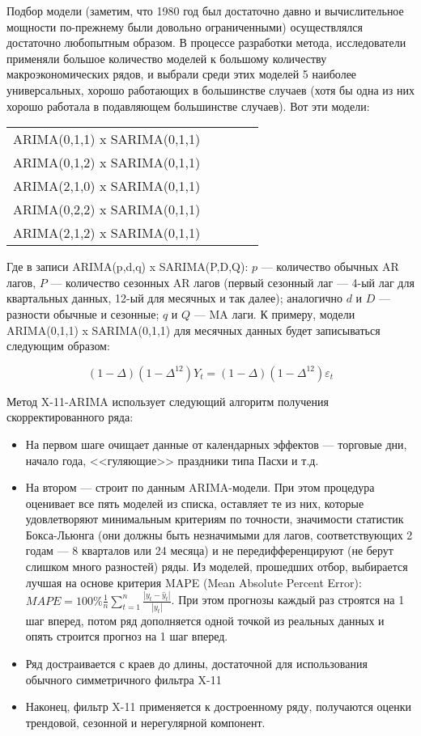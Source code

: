\documentclass[final,pdftex]{../../template/epsilonj}\usepackage[]{graphicx}\usepackage[]{color}
\begin{document}
Подбор модели (заметим, что 1980 год был достаточно давно и вычислительное мощности по-прежнему были довольно ограниченными) осуществлялся достаточно любопытным образом. В процессе разработки метода, исследователи применяли большое количество моделей к большому количеству макроэкономических рядов, и выбрали среди этих моделей 5 наиболее универсальных, хорошо работающих в большинстве случаев (хотя бы одна из них хорошо работала в подавляющем большинстве случаев). Вот эти модели:

\begin{center}
\begin{tabular}{ccccc}
ARIMA(0,1,1) x SARIMA(0,1,1) \\
ARIMA(0,1,2) x SARIMA(0,1,1) \\
ARIMA(2,1,0) x SARIMA(0,1,1) \\
ARIMA(0,2,2) x SARIMA(0,1,1) \\
ARIMA(2,1,2) x SARIMA(0,1,1) \\
\end{tabular}
\end{center}

Где в записи ARIMA(p,d,q) x SARIMA(P,D,Q): $p$ --- количество обычных AR лагов, $P$ --- количество сезонных AR лагов (первый сезонный лаг --- 4-ый лаг для квартальных данных, 12-ый для месячных и так далее); аналогично $d$ и $D$ --- разности обычные и сезонные; $q$ и $Q$ --- MA лаги. К примеру, модели ARIMA(0,1,1) x SARIMA(0,1,1) для месячных данных будет записываться следующим образом:

\[
(1 - \Delta)(1 - \Delta^{12})Y_t = (1 - \Delta)(1 - \Delta^{12}) \varepsilon_t
\]

Метод X-11-ARIMA использует следующий алгоритм получения скорректированного ряда: 

\begin{itemize}
\item На первом шаге очищает данные от календарных эффектов --- торговые дни, начало года, <<гуляющие>> праздники типа Пасхи и т.д.
\item На втором --- строит по данным ARIMA-модели. При этом процедура оценивает все пять моделей из списка, оставляет те из них, которые удовлетворяют минимальным критериям по точности, значимости статистик Бокса-Льюнга (они должны быть незначимыми для лагов, соответствующих 2 годам --- 8 кварталов или 24 месяца) и не передифференцируют (не берут слишком много разностей) ряды. Из моделей, прошедших отбор, выбирается лучшая на основе критерия MAPE (Mean Absolute Percent Error): $MAPE = 100\% \frac{1}{n} \sum_{t = 1}^n \frac{|y_t - \hat{y}_t|}{|y_t|}$. При этом прогнозы каждый раз строятся на 1 шаг вперед, потом ряд дополняется одной точкой из реальных данных и опять строится прогноз на 1 шаг вперед. 
\item Ряд достраивается с краев до длины, достаточной для использования обычного симметричного фильтра X-11
\item Наконец, фильтр X-11 применяется к достроенному ряду, получаются оценки трендовой, сезонной и нерегулярной компонент. 
\end{itemize}
\end{document}
